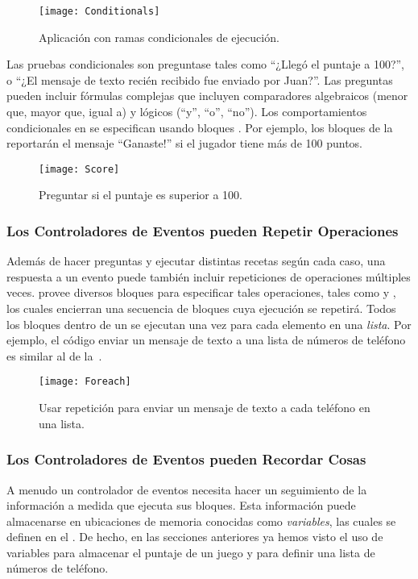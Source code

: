 \begin{figure}[H]
\centering
\texttt{[image: Conditionals]}
\caption{Aplicación con ramas condicionales de ejecución.}
\label{fig:conditionals}
\end{figure}

Las pruebas condicionales son preguntase tales como ``¿Llegó el
puntaje a 100?'', o ``¿El mensaje de texto recién recibido fue enviado
por Juan?''.  Las preguntas pueden incluir fórmulas complejas que
incluyen comparadores algebraicos (menor que, mayor que, igual a) y
lógicos (“y”, “o”, “no”). Los comportamientos condicionales en
\AppInventor se especifican usando bloques . Por
ejemplo, los bloques de la~ reportarán el mensaje
``Ganaste!'' si el jugador tiene más de 100 puntos.

\begin{figure}[H]
\centering
\texttt{[image: Score]}
\caption{Preguntar si el puntaje es superior a 100.}
\label{fig:score}
\end{figure}

\subsubsection*{Los Controladores de Eventos pueden Repetir Operaciones}
Además de hacer preguntas y ejecutar distintas recetas según cada
caso, una respuesta a un evento puede también incluir repeticiones de
operaciones múltiples veces. \AppInventor provee diversos bloques para
especificar tales operaciones, tales como  y
, los cuales encierran una
secuencia de bloques cuya ejecución se repetirá. Todos los bloques
dentro de un  se ejecutan una vez para cada elemento
en una \emph{lista}. Por ejemplo, el código enviar un mensaje de texto a
una lista de números de teléfono es similar al de
la~.

\begin{figure}[H]
\centering
\texttt{[image: Foreach]}
\caption{Usar repetición para enviar un mensaje de texto a cada
  teléfono en una lista.}
\label{fig:foreach}
\end{figure}

\subsubsection*{Los Controladores de Eventos pueden Recordar Cosas}

A menudo un controlador de eventos necesita hacer un seguimiento de la
información a medida que ejecuta sus bloques. Esta información puede
almacenarse en ubicaciones de memoria conocidas como \emph{variables}, las
cuales se definen en el \blockEditor. De hecho, en las secciones
anteriores ya hemos visto el uso de variables para almacenar el
puntaje de un juego y para definir una lista de números de teléfono.

